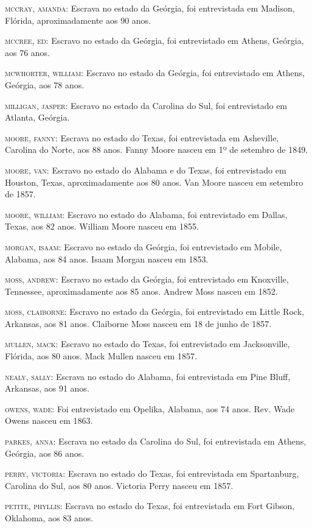 \begin{Parskip}
\textsc{mccray, amanda:} Escrava no estado da Geórgia, foi entrevistada
em Madison, Flórida, aproximadamente aos 90 anos.

\textsc{mccree, ed:} Escravo no estado da Geórgia, foi entrevistado em
Athens, Geórgia, aos 76 anos.

\textsc{mcwhorter, william:} Escravo no estado da Geórgia, foi
entrevistado em Athens, Geórgia, aos 78 anos.

\textsc{milligan, jasper:} Escravo no estado da Carolina do Sul, foi
entrevistado em Atlanta, Geórgia.

\textsc{moore, fanny:} Escrava no estado do Texas, foi entrevistada em
Asheville, Carolina do Norte, aos 88 anos. Fanny Moore nasceu em 1º de
setembro de 1849.

\textsc{moore, van:} Escravo no estado do Alabama e do Texas, foi
entrevistado em Houston, Texas, aproximadamente aos 80 anos. Van Moore
nasceu em setembro de 1857.

\textsc{moore, william:} Escravo no estado do Alabama, foi entrevistado
em Dallas, Texas, aos 82 anos. William Moore nasceu em 1855.

\textsc{morgan, isaam:} Escravo no estado da Geórgia, foi entrevistado
em Mobile, Alabama, aos 84 anos. Isaam Morgan nasceu em 1853.

\textsc{moss, andrew:} Escravo no estado da Geórgia, foi entrevistado em
Knoxville, Tennessee, aproximadamente aos 85 anos. Andrew Moss nasceu em
1852.

\textsc{moss, claiborne:} Escravo no estado da Geórgia, foi entrevistado
em Little Rock, Arkansas, aos 81 anos. Claiborne Moss nasceu em 18 de
junho de 1857.

\textsc{mullen, mack:} Escravo no estado do Texas, foi entrevistado em
Jacksonville, Flórida, aos 80 anos. Mack Mullen nasceu em 1857.

\textsc{nealy, sally:} Escrava no estado do Alabama, foi entrevistada em
Pine Bluff, Arkansas, aos 91 anos.

\textsc{owens, wade:} Foi entrevistado em Opelika, Alabama, aos 74 anos.
Rev. Wade Owens nasceu em 1863.

\textsc{parkes, anna:} Escrava no estado da Carolina do Sul, foi
entrevistada em Athens, Geórgia, aos 86 anos.

\textsc{perry, victoria:} Escrava no estado do Texas, foi entrevistada
em Spartanburg, Carolina do Sul, aos 80 anos. Victoria Perry nasceu em
1857.

\textsc{petite, phyllis:} Escrava no estado do Texas, foi entrevistada
em Fort Gibson, Oklahoma, aos 83 anos.


\end{Parskip}
